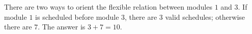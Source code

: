There are two ways to orient the flexible relation between modules $1$ and $3$. If module $1$ is scheduled before module $3$, there are $3$ valid schedules; otherwise there are $7$. The answer is $3 + 7 = 10$.
